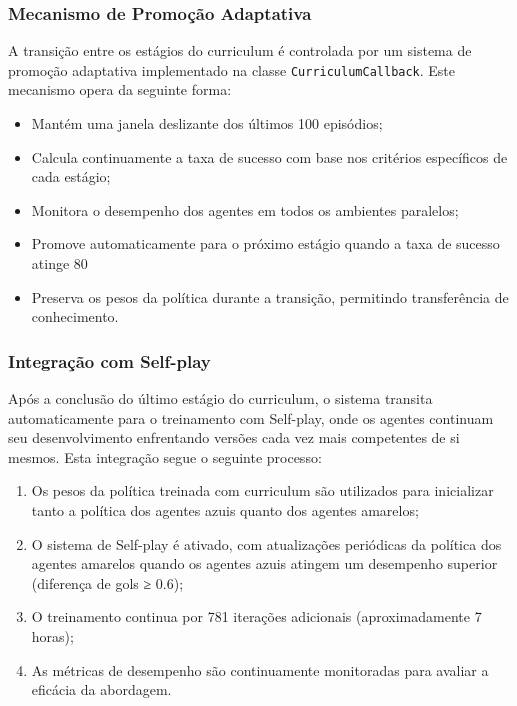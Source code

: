 \subsubsection{Mecanismo de Promoção Adaptativa}

A transição entre os estágios do curriculum é controlada por um sistema de promoção adaptativa implementado na classe \texttt{CurriculumCallback}. Este mecanismo opera da seguinte forma:

\begin{itemize}
    \item Mantém uma janela deslizante dos últimos 100 episódios;
    \item Calcula continuamente a taxa de sucesso com base nos critérios específicos de cada estágio;
    \item Monitora o desempenho dos agentes em todos os ambientes paralelos;
    \item Promove automaticamente para o próximo estágio quando a taxa de sucesso atinge 80%
    \item Preserva os pesos da política durante a transição, permitindo transferência de conhecimento.
\end{itemize}

\subsubsection{Integração com Self-play}

Após a conclusão do último estágio do curriculum, o sistema transita automaticamente para o treinamento com Self-play, onde os agentes continuam seu desenvolvimento enfrentando versões cada vez mais competentes de si mesmos. Esta integração segue o seguinte processo:

\begin{enumerate}
    \item Os pesos da política treinada com curriculum são utilizados para inicializar tanto a política dos agentes azuis quanto dos agentes amarelos;
    \item O sistema de Self-play é ativado, com atualizações periódicas da política dos agentes amarelos quando os agentes azuis atingem um desempenho superior (diferença de gols ≥ 0.6);
    \item O treinamento continua por 781 iterações adicionais (aproximadamente 7 horas);
    \item As métricas de desempenho são continuamente monitoradas para avaliar a eficácia da abordagem.
\end{enumerate}


